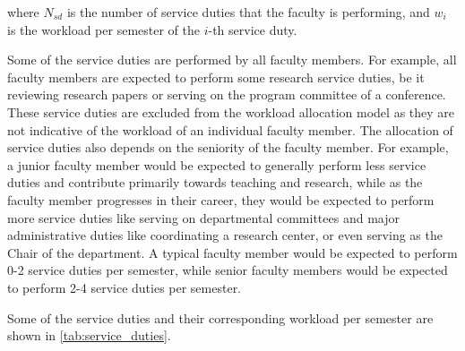 where $N_{sd}$ is the number of service duties that the faculty is performing, and $w_i$ is the workload per semester of the $i$-th service duty.

Some of the service duties are performed by all faculty members. For example, all faculty members are expected to perform some research service duties, be it reviewing research papers or serving on the program committee of a conference. These service duties are excluded from the workload allocation model as they are not indicative of the workload of an individual faculty member. The allocation of service duties also depends on the seniority of the faculty member. For example, a junior faculty member would be expected to generally perform less service duties and contribute primarily towards teaching and research, while as the faculty member progresses in their career, they would be expected to perform more service duties like serving on departmental committees and major administrative duties like coordinating a research center, or even serving as the Chair of the department. A typical faculty member would be expected to perform 0-2 service duties per semester, while senior faculty members would be expected to perform 2-4 service duties per semester.

Some of the service duties and their corresponding workload per semester are shown in \autoref{tab:service_duties}.


